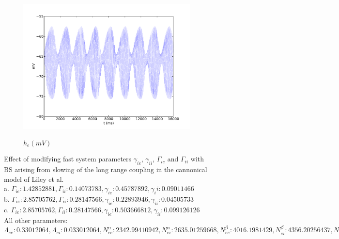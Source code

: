 \documentclass[a4paper,12pt]{article}
\begin{document}
\begin{figure}
\begin{subfigure}[b]{0.3\textwidth}
		\includegraphics[scale=0.22]{chosen-frontiers-2012/00416-1_1-2-1-he-phi.pdf}
		\label{fig:416_phi_c}
		\caption{$h_e (mV)$}
	\end{subfigure}

	\label{fig:phi_fast_var}
	\caption{Effect of modifying fast system parameters $\gamma_{ie}$, $\gamma_{ii}$, $\Gamma_{ie}$ and $\Gamma_{ii}$ with BS arising from slowing of the long range coupling in the cannonical model of Liley et al.\\
	a. $\Gamma_{ie}: 1.42852881, \Gamma_{ii}: 0.14073783, \gamma_{ie}: 0.45787892, \gamma_ii: 0.09011466$ \\
	b. $\Gamma_{ie}: 2.85705762, \Gamma_{ii}: 0.28147566, \gamma_{ie}: 0.22893946,  \gamma_{ii}: 0.04505733$\\
	c. $\Gamma_{ie}: 2.85705762, \Gamma_{ii}: 0.28147566, \gamma_{ie}: 0.503666812,  \gamma_{ii}: 0.099126126$\\
All other parameters:\\
$\Lambda_{ee}: 0.33012064, \Lambda_{ei}: 0.033012064, N^{\alpha}_{ee}: 2342.99410942, N^{\alpha}_{ei}: 2635.01259668,
N^{\beta}_{ee}: 4016.1981429, N^{\beta}_{ei}: 4356.20256437, N^{\beta}_{ie}: 634.73935613, N^{\beta}_{ii}: 473.38388612,
\Gamma_{ee}: 0.13699266, \Gamma_{ei}: 0.4439827, \gamma_{ee}: 0.244953287255, \gamma_{ei}: 0.82969594, h^{rest}_e: -61.7485641, h^{eq}_{ee}: 5.73011624, h^{eq}_{ei}: 2.099135,
h^{rest}_i: -64.46142322, h^{eq}_{ie}: -81.67044311, h^{eq}_{ii}: -82.29433835, \mu_e: -53.10048735, \mu_i: -53.68380602, p_{ee}: 3.6997382629, p_{ei}: 0.60015865013, p_{ie}: 0.0, p_{ii}: 0.0, \phi_{ie}: 0,
\phi_{ii}: 0, S^{max}_e: 0.0930382, S^{max}_i: 0.0648537, \sigma_e: 4.64535035,
\sigma_i: 3.10925431, \tau_e: 86.1876, \tau_i: 65.0391, v_{ee}: 0.160606, v_{ei}: 0.160606$
}

\end{figure}
\end{document}
